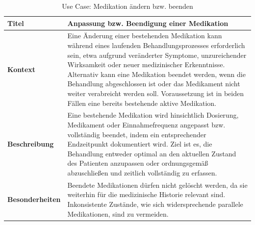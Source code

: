 \begin{table}[H]
\centering
\renewcommand{\arraystretch}{1.4}
\begin{tabularx}{\textwidth}{|p{4cm}|X|}
\hline
\textbf{Titel} & \textbf{Anpassung bzw. Beendigung einer Medikation} \\
\hline
\textbf{Kontext} &
Eine Änderung einer bestehenden Medikation kann während eines laufenden Behandlungsprozesses erforderlich sein, etwa aufgrund veränderter Symptome, unzureichender Wirksamkeit oder neuer medizinischer Erkenntnisse. Alternativ kann eine Medikation beendet werden, wenn die Behandlung abgeschlossen ist oder das Medikament nicht weiter verabreicht werden soll. Voraussetzung ist in beiden Fällen eine bereits bestehende aktive Medikation. \\
\hline
\textbf{Beschreibung} &
Eine bestehende Medikation wird hinsichtlich Dosierung, Medikament oder Einnahmefrequenz angepasst bzw. vollständig beendet, indem ein entsprechender Endzeitpunkt dokumentiert wird. Ziel ist es, die Behandlung entweder optimal an den aktuellen Zustand des Patienten anzupassen oder ordnungsgemäß abzuschließen und zeitlich vollständig zu erfassen. \\
\hline
\textbf{Besonderheiten} &
Beendete Medikationen dürfen nicht gelöscht werden, da sie weiterhin für die medizinische Historie relevant sind. Inkonsistente Zustände, wie sich widersprechende parallele Medikationen, sind zu vermeiden. \\
\hline
\end{tabularx}
\caption{Use Case: Medikation ändern bzw. beenden}
\end{table}

